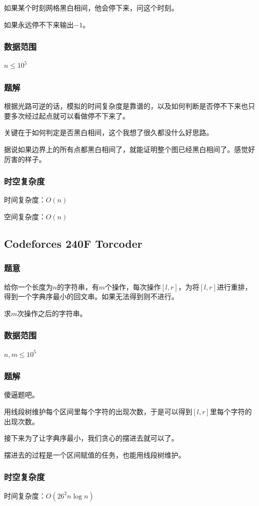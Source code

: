 \documentclass{ctexart}
\begin{document}
如果某个时刻网格黑白相间，他会停下来，问这个时刻。

如果永远停不下来输出$-1$。
\subsubsection{数据范围}
$n \le 10^5$
\subsubsection{题解}
根据光路可逆的话，模拟的时间复杂度是靠谱的，以及如何判断是否停不下来也只要多次经过起点就可以看做停不下来了。

关键在于如何判定是否黑白相间，这个我想了很久都没什么好思路。

据说如果边界上的所有点都黑白相间了，就能证明整个图已经黑白相间了。感觉好厉害的样子。
\subsubsection{时空复杂度}
时间复杂度：$O(n)$

空间复杂度：$O(n)$
\subsection{Codeforces 240F Torcoder}
\subsubsection{题意}
给你一个长度为$n$的字符串，有$m$个操作，每次操作$[l,r]$，为将$[l,r]$进行重排，得到一个字典序最小的回文串。如果无法得到则不进行。

求$m$次操作之后的字符串。
\subsubsection{数据范围}
$n,m \le 10^5$
\subsubsection{题解}
傻逼题吧。

用线段树维护每个区间里每个字符的出现次数，于是可以得到$[l,r]$里每个字符的出现次数。

接下来为了让字典序最小，我们贪心的摆进去就可以了。

摆进去的过程是一个区间赋值的任务，也能用线段树维护。
\subsubsection{时空复杂度}
时间复杂度：$O(26^2n \log n)$
\end{document}
